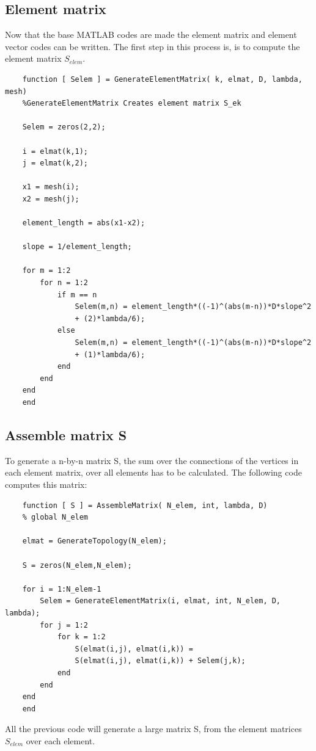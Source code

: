 \documentclass[a4paper]{report}
\begin{document}
\subsection{Element matrix}

Now that the base MATLAB codes are made the element matrix and element vector codes can be written. The first step in this process is, is to compute the element matrix $S_{elem}$.

\begin{lstlisting}
	function [ Selem ] = GenerateElementMatrix( k, elmat, D, lambda, mesh)
	%GenerateElementMatrix Creates element matrix S_ek
		
	Selem = zeros(2,2);
	
	i = elmat(k,1);
	j = elmat(k,2);
	
	x1 = mesh(i);
	x2 = mesh(j);
	
	element_length = abs(x1-x2);
	
	slope = 1/element_length; 
	
	for m = 1:2
		for n = 1:2
			if m == n
				Selem(m,n) = element_length*((-1)^(abs(m-n))*D*slope^2
				+ (2)*lambda/6);
			else
				Selem(m,n) = element_length*((-1)^(abs(m-n))*D*slope^2
				+ (1)*lambda/6);
			end
		end
	end
	end
\end{lstlisting}

\bigskip




\subsection{Assemble matrix S}
To generate a n-by-n matrix S, the sum over the connections of the vertices in each element matrix, over all elements has to be calculated. The following code computes this matrix:

\begin{lstlisting}
	function [ S ] = AssembleMatrix( N_elem, int, lambda, D)
	% global N_elem 
	
	elmat = GenerateTopology(N_elem);
	
	S = zeros(N_elem,N_elem);
	
	for i = 1:N_elem-1
		Selem = GenerateElementMatrix(i, elmat, int, N_elem, D, lambda);
		for j = 1:2
			for k = 1:2
				S(elmat(i,j), elmat(i,k)) =
				S(elmat(i,j), elmat(i,k)) +	Selem(j,k);
			end
		end
	end
	end

\end{lstlisting}



All the previous code will generate a large matrix S, from the element matrices $S_{elem}$ over each element.\\
\end{document}

